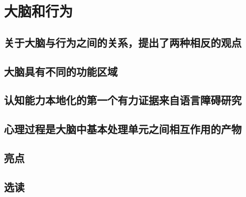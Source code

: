 \chapter{大脑和行为}

\section{关于大脑与行为之间的关系，提出了两种相反的观点}


\section{大脑具有不同的功能区域}


\section{认知能力本地化的第一个有力证据来自语言障碍研究}


\section{心理过程是大脑中基本处理单元之间相互作用的产物}




\section{亮点}

\section{选读}

